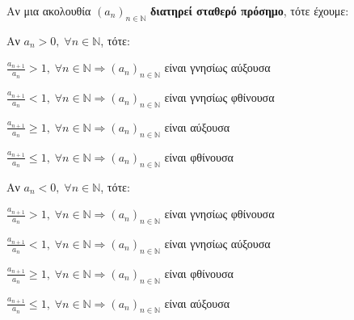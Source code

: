 \documentclass[a4paper,table]{report}
\newcommand{\twocolumnsidesss}[2]{\begin{minipage}[t]{0.49\linewidth}\raggedright
        #1
        \end{minipage}\hfill\begin{minipage}[t]{0.49\linewidth}\raggedright
        #2
    \end{minipage}
}
\begin{document}
\begin{rem}\label{dfn:isodmono}
\item {}
  Αν μια ακολουθία $ (a_{n})_{n \in \mathbb{N}} $ \textbf{διατηρεί σταθερό πρόσημο}, 
  τότε έχουμε:

  \twocolumnsidesss{
    Αν $ a_{n}>0, \; \forall n \in \mathbb{N} $, τότε:
    \begin{myitemize}[leftmargin=*]
      \item $ \frac{a_{n+1}}{a_{n}} > 1, \; \forall n \in \mathbb{N} \Rightarrow
        (a_{n})_{n \in \mathbb{N}} $ είναι \textcolor{Col1}{γνησίως αύξουσα}  
      \item $ \frac{a_{n+1}}{a_{n}} < 1, \; \forall n \in \mathbb{N} \Rightarrow 
        (a_{n})_{n \in \mathbb{N}} $ είναι \!\textcolor{Col1}{γνησίως φθίνουσα}  
      \item $ \frac{a_{n+1}}{a_{n}} \geq 1, \; \forall n \in \mathbb{N} \Rightarrow 
        (a_{n})_{n \in \mathbb{N}} $ είναι \textcolor{Col1}{αύξουσα} 
      \item $ \frac{a_{n+1}}{a_{n}} \leq 1, \; \forall n \in \mathbb{N} \Rightarrow 
        (a_{n})_{n \in \mathbb{N}} $ είναι \textcolor{Col1}{φθίνουσα}
    \end{myitemize}
    }{
    Αν $ a_{n}<0, \; \forall n \in \mathbb{N} $, τότε:
    \begin{myitemize}[leftmargin=*]
      \item $ \frac{a_{n+1}}{a_{n}} > 1, \; \forall n \in \mathbb{N} \Rightarrow
        (a_{n})_{n \in \mathbb{N}} $ είναι \!\textcolor{Col1}{γνησίως φθίνουσα}  
      \item $ \frac{a_{n+1}}{a_{n}} < 1, \; \forall n \in \mathbb{N} \Rightarrow
        (a_{n})_{n \in \mathbb{N}} $ είναι \textcolor{Col1}{γνησίως αύξουσα}  
      \item $ \frac{a_{n+1}}{a_{n}} \geq 1, \; \forall n \in \mathbb{N} \Rightarrow 
        (a_{n})_{n \in \mathbb{N}} $ είναι \textcolor{Col1}{φθίνουσα}  
      \item $ \frac{a_{n+1}}{a_{n}} \leq 1, \; \forall n \in \mathbb{N} \Rightarrow 
        (a_{n})_{n \in \mathbb{N}} $ είναι \textcolor{Col1}{αύξουσα}  
    \end{myitemize}
  }
\end{rem}
\end{document}
